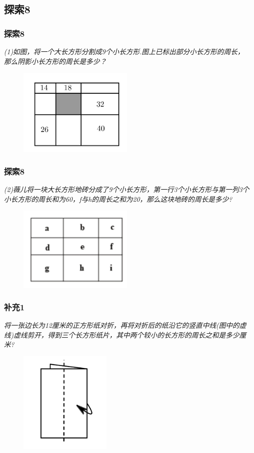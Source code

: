 \subsection{探索8}
\begin{frame}
    \frametitle{探索8}
    \textit{(1)如图，将一个大长方形分割成9个小长方形.图上已标出部分小长方形的周长，那么阴影小长方形的周长是多少？}
    \begin{figure}[H] 
        \centering
        \includegraphics[width=0.5\textwidth]{./pics/Chapter_1/tansuo8_1.png}
    \end{figure}
\end{frame}

\begin{frame}
    \frametitle{探索8}
    \textit{(2)薇儿将一块大长方形地砖分成了9个小长方形，第一行3个小长方形与第一列3个小长方形的周长和为60，f与h的周长之和为20，那么这块地砖的周长是多少?}
    \begin{figure}[H] 
        \centering
        \includegraphics[width=0.5\textwidth]{./pics/Chapter_1/tansuo8_2.png}
    \end{figure}
\end{frame}

\begin{frame}
    \frametitle{补充1}
    \textit{将一张边长为12厘米的正方形纸对折，再将对折后的纸沿它的竖直中线(图中的虚线)虚线剪开，得到三个长方形纸片，其中两个较小的长方形的周长之和是多少厘米?}
    \begin{figure}[H] 
        \centering
        \includegraphics[width=0.4\textwidth]{./pics/Chapter_1/buchong1.png}
    \end{figure}
\end{frame}

